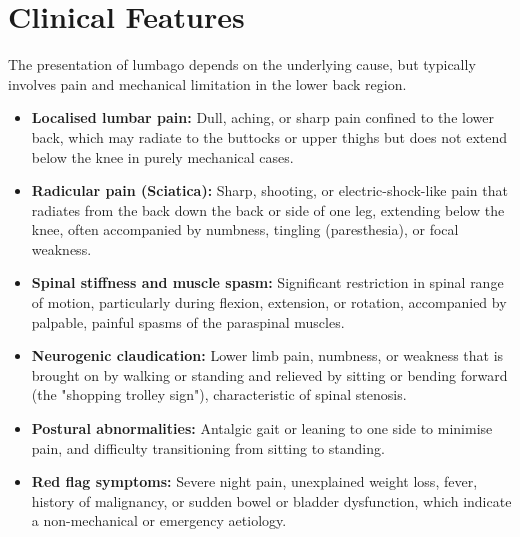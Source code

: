 \section*{Clinical Features}
The presentation of lumbago depends on the underlying cause, but typically involves pain and mechanical limitation in the lower back region.
\begin{itemize}
    \item \textbf{Localised lumbar pain:} Dull, aching, or sharp pain confined to the lower back, which may radiate to the buttocks or upper thighs but does not extend below the knee in purely mechanical cases.
    \item \textbf{Radicular pain (Sciatica):} Sharp, shooting, or electric-shock-like pain that radiates from the back down the back or side of one leg, extending below the knee, often accompanied by numbness, tingling (paresthesia), or focal weakness.
    \item \textbf{Spinal stiffness and muscle spasm:} Significant restriction in spinal range of motion, particularly during flexion, extension, or rotation, accompanied by palpable, painful spasms of the paraspinal muscles.
    \item \textbf{Neurogenic claudication:} Lower limb pain, numbness, or weakness that is brought on by walking or standing and relieved by sitting or bending forward (the "shopping trolley sign"), characteristic of spinal stenosis.
    \item \textbf{Postural abnormalities:} Antalgic gait or leaning to one side to minimise pain, and difficulty transitioning from sitting to standing.
    \item \textbf{Red flag symptoms:} Severe night pain, unexplained weight loss, fever, history of malignancy, or sudden bowel or bladder dysfunction, which indicate a non-mechanical or emergency aetiology.
\end{itemize}

